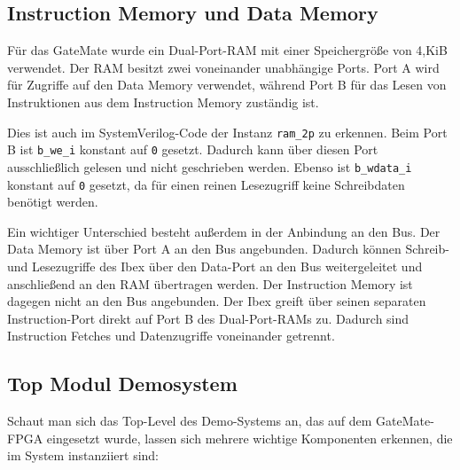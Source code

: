 \documentclass[a4paper,11pt]{article}
\begin{document}

\subsection{Instruction Memory und Data Memory}
Für das GateMate wurde ein Dual-Port-RAM mit einer Speichergröße von 4,KiB verwendet. Der RAM besitzt zwei voneinander unabhängige Ports. Port A wird für Zugriffe auf den Data Memory verwendet, während Port B für das Lesen von Instruktionen aus dem Instruction Memory zuständig ist.

Dies ist auch im SystemVerilog-Code der Instanz \texttt{ram\_2p} zu erkennen. Beim Port B ist \texttt{b\_we\_i} konstant auf \texttt{0} gesetzt. Dadurch kann über diesen Port ausschließlich gelesen und nicht geschrieben werden. Ebenso ist \texttt{b\_wdata\_i} konstant auf \texttt{0} gesetzt, da für einen reinen Lesezugriff keine Schreibdaten benötigt werden.

Ein wichtiger Unterschied besteht außerdem in der Anbindung an den Bus. Der Data Memory ist über Port A an den Bus angebunden. Dadurch können Schreib- und Lesezugriffe des Ibex über den Data-Port an den Bus weitergeleitet und anschließend an den RAM übertragen werden. Der Instruction Memory ist dagegen nicht an den Bus angebunden. Der Ibex greift über seinen separaten Instruction-Port direkt auf Port B des Dual-Port-RAMs zu. Dadurch sind Instruction Fetches und Datenzugriffe voneinander getrennt.

\subsection{Top Modul Demosystem}
%     
Schaut man sich das Top-Level des Demo-Systems an, das auf dem GateMate-FPGA eingesetzt wurde, lassen sich mehrere wichtige Komponenten erkennen, die im System instanziiert sind:
\end{document}
